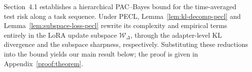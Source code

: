 \documentclass{article}
\theoremstyle{plain}
\theoremstyle{definition}
\theoremstyle{remark}
\begin{document}





Section~4.1 establishes a hierarchical PAC--Bayes bound for the time-averaged test risk along a task sequence.
Under PECL, Lemma~\ref{lem:kl-decomp-pecl} and Lemma~\ref{lem:subspace-loss-pecl} rewrite its complexity and empirical terms entirely in the LoRA update subspace $\mathcal W_\Delta$, through the adapter-level KL divergence and the subspace sharpness, respectively. 
Substituting these reductions into the bound yields our main result below; the proof is given in Appendix~\ref{proof:theorem}.
\end{document}
